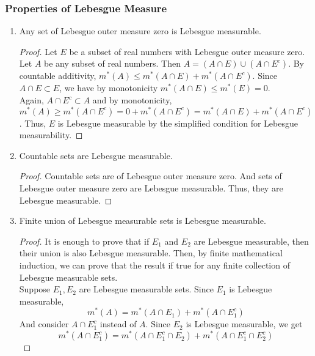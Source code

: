 \subsubsection{Properties of Lebesgue Measure}
\begin{enumerate}
	\item Any set of Lebesgue outer measure zero is Lebesgue measurable.
	\begin{proof}
		Let $E$ be a subset of real numbers with Lebesgue outer measure zero.
		Let $A$ be any subset of real numbers.
		Then $A = (A \cap E) \cup (A \cap E^c)$.
		By countable additivity, $m^\ast(A) \le m^\ast(A \cap E) + m^\ast(A \cap E^c)$.
		Since $A\cap E \subset E$, we have by monotonicity $m^\ast(A \cap E) \le m^\ast(E) = 0$.\\


		Again, $A \cap E^c \subset A$ and by monotonicity, $m^\ast(A) \ge m^\ast(A \cap E^c) = 0+m^\ast(A \cap E^c) = m^\ast(A\cap E) + m^\ast(A \cap E^c)$.
		Thus, $E$ is Lebesgue measurable by the simplified condition for Lebesgue measurability.
	\end{proof}

	\item Countable sets are Lebesgue measurable.
	\begin{proof}
	Countable sets are of Lebesgue outer measure zero.
	And sets of Lebesgue outer measure zero are Lebesgue measurable.
	Thus, they are Lebesgue measurable.
	\end{proof}
	\item Finite union of Lebesgue measurable sets is Lebesgue measurable.
	\begin{proof}
		It is enough to prove that if $E_1$ and $E_2$ are Lebesgue measurable, then their union is also Lebesgue measurable.
		Then, by finite mathematical induction, we can prove that the result if true for any finite collection of Lebesgue measurable sets.\\


	Suppose $E_1, E_2$ are Lebesgue measurable sets.
	Since $E_1$ is Lebesgue measurable,
	\begin{equation}
		m^\ast(A) = m^\ast(A \cap E_1) + m^\ast(A \cap E_1^c)
	\end{equation}
	And consider $A \cap E_1^c$ instead of $A$.
	Since $E_2$ is Lebesgue measurable, we get
	\begin{equation}
		m^\ast(A \cap E_1^c) = m^\ast(A \cap E_1^c\cap  E_2) + m^\ast(A \cap E_1^c \cap E_2^c)
	\end{equation}


\end{proof}
\end{enumerate}
